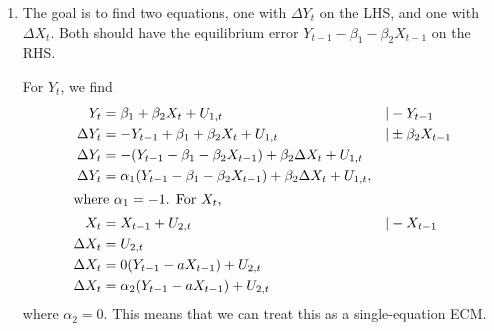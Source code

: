 \documentclass[11pt, a4paper]{article}
\begin{document}
\begin{enumerate}
\begin{enumerate}
\item The goal is to find two equations, one with $\Delta Y_t$ on the LHS, and one with $\Delta X_t.$ Both should have the equilibrium error $Y_{t-1}-\beta_1-\beta_2 X_{t-1}$ on the RHS.

For $Y_t$, we find
\begin{align*}
Y_t&=\beta_1 +\beta_2 X_t+U_{1,t}&|&-Y_{t-1}\\
\Delta Y_t&=-Y_{t-1}+\beta_1+\beta_2X_t+U_{1,t}&|&\pm \beta_2 X_{t-1}\\
\Delta Y_t&=-(Y_{t-1}-\beta_1-\beta_2 X_{t-1})+\beta_2\Delta X_t+U_{1,t}&\\
\Delta Y_t&=\alpha_1(Y_{t-1}-\beta_1-\beta_2X_{t-1})+\beta_2\Delta X_t+U_{1,t},&\\
\intertext{where $\alpha_1=-1$. For $X_t$, }
X_t&=X_{t-1}+U_{2,t}&|&-X_{t-1}\\
\Delta X_t&=U_{2,t}&&\\
\Delta X_t&=0(Y_{t-1}-aX_{t-1})+U_{2,t}\\
\Delta X_t&=\alpha_2(Y_{t-1}-aX_{t-1})+U_{2,t}
\end{align*}
where $\alpha_2=0$. This means that we can treat this as a single-equation ECM.
\end{enumerate}
\end{enumerate}
\end{document}
